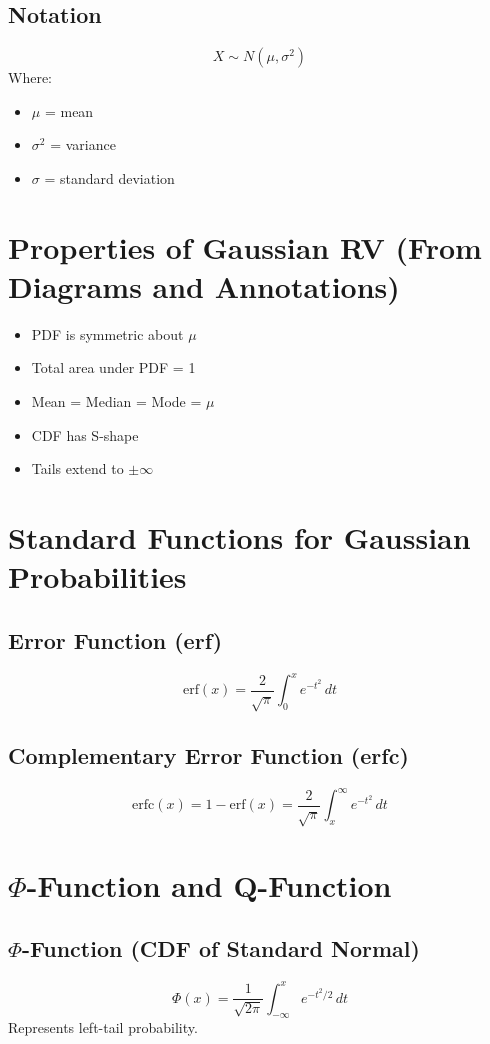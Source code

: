 \documentclass[11pt]{article}
\begin{document}
\subsection{Notation}
\[ X \sim N(\mu, \sigma^2) \]
Where:
\begin{itemize}
    \item $\mu$ = mean
    \item $\sigma^2$ = variance
    \item $\sigma$ = standard deviation
\end{itemize}

\section{Properties of Gaussian RV (From Diagrams and Annotations)}
\begin{itemize}
    \item PDF is symmetric about $\mu$
    \item Total area under PDF = 1
    \item Mean = Median = Mode = $\mu$
    \item CDF has S-shape
    \item Tails extend to $\pm \infty$
\end{itemize}

\section{Standard Functions for Gaussian Probabilities}

\subsection{Error Function (erf)}
\[ \text{erf}(x) = \frac{2}{\sqrt{\pi}} \int_{0}^{x} e^{-t^2} \, dt \]

\subsection{Complementary Error Function (erfc)}
\[ \text{erfc}(x) = 1 - \text{erf}(x) = \frac{2}{\sqrt{\pi}} \int_{x}^{\infty} e^{-t^2} \, dt \]

\section{$\Phi$-Function and Q-Function}

\subsection{$\Phi$-Function (CDF of Standard Normal)}
\[ \Phi(x) = \frac{1}{\sqrt{2\pi}} \int_{-\infty}^{x} e^{-t^2/2} \, dt \]
Represents left-tail probability.
\end{document}
